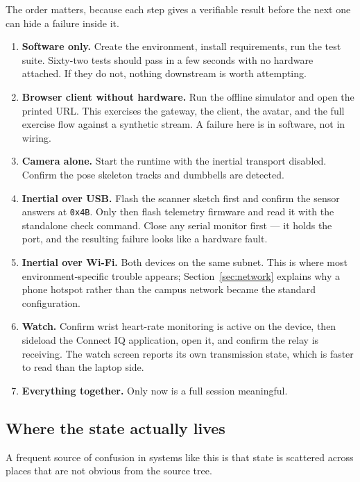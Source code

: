 \documentclass[11pt,a4paper]{article}
\newcommand{\code}[1]{\texttt{\small #1}}
\begin{document}
The order matters, because each step gives a verifiable result before the next
one can hide a failure inside it.

\begin{enumerate}
\item \textbf{Software only.} Create the environment, install requirements, run
the test suite. Sixty-two tests should pass in a few seconds with no hardware
attached. If they do not, nothing downstream is worth attempting.

\item \textbf{Browser client without hardware.} Run the offline simulator and
open the printed URL. This exercises the gateway, the client, the avatar, and
the full exercise flow against a synthetic stream. A failure here is in software,
not in wiring.

\item \textbf{Camera alone.} Start the runtime with the inertial transport
disabled. Confirm the pose skeleton tracks and dumbbells are detected.

\item \textbf{Inertial over USB.} Flash the scanner sketch first and confirm
the sensor answers at \code{0x4B}. Only then flash telemetry firmware and read
it with the standalone check command. Close any serial monitor first --- it
holds the port, and the resulting failure looks like a hardware fault.

\item \textbf{Inertial over Wi-Fi.} Both devices on the same subnet. This is
where most environment-specific trouble appears; Section~\ref{sec:network}
explains why a phone hotspot rather than the campus network became the standard
configuration.

\item \textbf{Watch.} Confirm wrist heart-rate monitoring is active on the
device, then sideload the Connect IQ application, open it, and confirm the
relay is receiving. The watch screen reports its own transmission state, which
is faster to read than the laptop side.

\item \textbf{Everything together.} Only now is a full session meaningful.
\end{enumerate}

\subsection{Where the state actually lives}

A frequent source of confusion in systems like this is that state is scattered
across places that are not obvious from the source tree.
\end{document}

